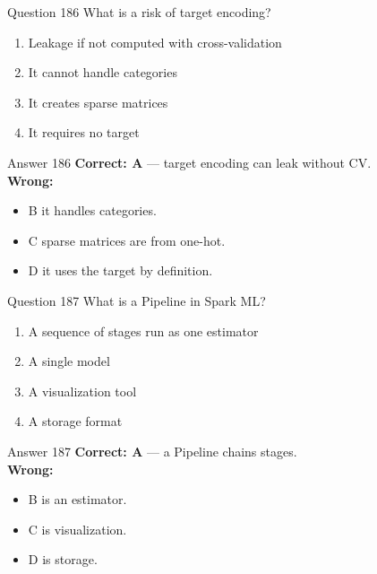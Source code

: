 \documentclass[aspectratio=169,11pt]{beamer}
\begin{document}
	\begin{frame}{Question 186}
		What is a risk of target encoding?
		\begin{enumerate}[label=\Alph*.]
			\item Leakage if not computed with cross-validation
			\item It cannot handle categories
			\item It creates sparse matrices
			\item It requires no target
		\end{enumerate}
	\end{frame}
	\begin{frame}{Answer 186}
		\textbf{Correct: A} --- target encoding can leak without CV.\\
		\vspace{0.5em}
		\textbf{Wrong:}
		\begin{itemize}
			\item B it handles categories.
			\item C sparse matrices are from one-hot.
			\item D it uses the target by definition.
		\end{itemize}
	\end{frame}
	
	\begin{frame}{Question 187}
		What is a Pipeline in Spark ML?
		\begin{enumerate}[label=\Alph*.]
			\item A sequence of stages run as one estimator
			\item A single model
			\item A visualization tool
			\item A storage format
		\end{enumerate}
	\end{frame}
	\begin{frame}{Answer 187}
		\textbf{Correct: A} --- a Pipeline chains stages.\\
		\vspace{0.5em}
		\textbf{Wrong:}
		\begin{itemize}
			\item B is an estimator.
			\item C is visualization.
			\item D is storage.
		\end{itemize}
	\end{frame}
	
\end{document}
